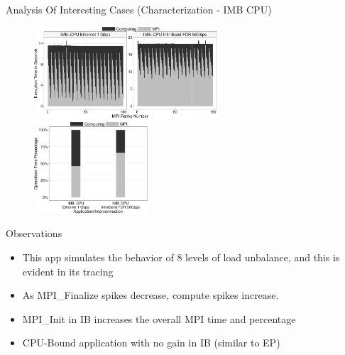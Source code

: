 \documentclass{beamer}
\begin{document}
\begin{frame}{Analysis Of Interesting Cases (Characterization - IMB CPU)}
\begin{figure}
   \includegraphics[width=0.61\textwidth]{SLIDES/img/IMB-CPU.charac.pdf}
   \includegraphics[width=0.38\textwidth]{SLIDES/img/IMB_CPU.percentage.pdf}
\end{figure}
Observations
\begin{itemize}
    \pause \item This app simulates the behavior of 8 levels of load unbalance, and this is evident in its tracing
    \pause \item As MPI\_Finalize spikes decrease, compute spikes increase.
    \pause \item MPI\_Init in IB increases the overall MPI time and percentage
    \pause \item CPU-Bound application with no gain in IB (similar to EP) 

\end{itemize}
\end{frame}
\end{document}
